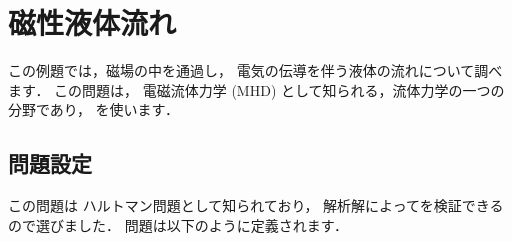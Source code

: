 \section{磁性液体流れ}
\label{sec:3.5}
この例題では，磁場の中を通過し，
%
電気の伝導を伴う液体の流れについて調べます．
この問題は，
%
電磁流体力学 (MHD) として知られる，流体力学の一つの分野であり，
%
%
を使います．


\subsection{問題設定}
\label{ssec:3.5.1}
この問題は
%
ハルトマン問題として知られており，
解析解によってを検証できるので選びました．
問題は以下のように定義されます．
